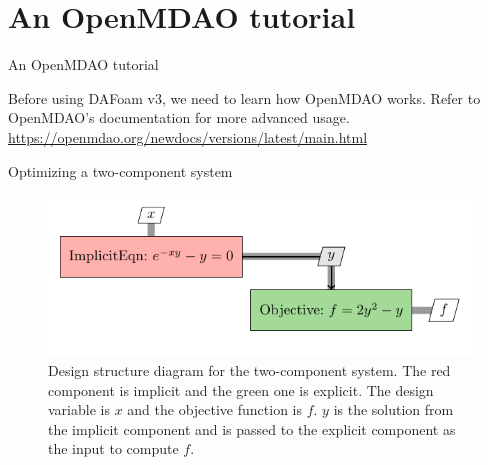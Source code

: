 \documentclass{bredelebeamer}
\begin{document}
\section{An OpenMDAO tutorial}
\renewcommand{\arraystretch}{2}

\begin{frame}{}
  \center \Large An OpenMDAO tutorial

  \normalsize
  Before using DAFoam v3, we need to learn how OpenMDAO works.
  Refer to OpenMDAO's documentation for more advanced usage. \\ 
  \url{https://openmdao.org/newdocs/versions/latest/main.html}
\end{frame}

\begin{frame}[fragile]{Optimizing a two-component system}
  \begin{figure}
    \includegraphics[width=\linewidth]{images/example_xdsm.pdf} 
    \caption{Design structure diagram for the two-component system. The red component is implicit and the green one is explicit. The design variable is $x$ and the objective function is $f$. $y$ is the solution from the implicit component and is passed to the explicit component as the input to compute $f$.}
  \end{figure}
\end{frame}
\end{document}
